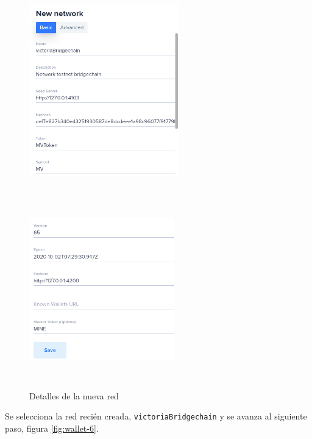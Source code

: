 \begin{figure}[H]
	\centering
	\begin{minipage}{0.4\textwidth}
		\includegraphics[width=6.5cm,height=8.5cm]{figuras/wallet_4.png}
	\end{minipage}\vfill
	\begin{minipage}{0.38\textwidth}
		\includegraphics[width=6.3cm,height=8.5cm]{figuras/wallet_5.png}	
	\end{minipage}
	\caption{Detalles de la nueva red}
	\label{fig:wallet-4-5}
\end{figure}

\newpage
Se selecciona la red recién creada, \texttt{victoriaBridgechain} y se avanza al siguiente paso, figura \ref{fig:wallet-6}.\\


